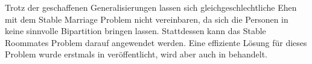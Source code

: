 Trotz der geschaffenen Generalisierungen lassen sich gleichgeschlechtliche Ehen mit dem Stable Marriage Problem nicht vereinbaren, da sich die Personen in keine sinnvolle Bipartition bringen lassen. Stattdessen kann das Stable Roommates Problem darauf angewendet werden. Eine effiziente Lösung für dieses Problem wurde erstmals in \cite{Irving:1985} veröffentlicht, wird aber auch in \cite{Gusfield:1989} behandelt.
